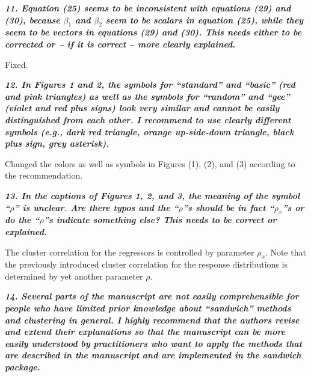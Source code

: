 \documentclass[10pt,a4paper]{article}
\begin{document}
\medskip

\textbf{\textit{11. Equation (25) seems to be inconsistent with equations (29) and (30), because $\beta_1$ and
$\beta_2$ seem to be scalars in equation (25), while they seem to be vectors in equations (29)
and (30). This needs either to be corrected or -- if it is correct -- more clearly explained.}}

\medskip

Fixed.

\medskip

\textbf{\textit{12. In Figures 1 and 2, the symbols for ``standard'' and ``basic'' (red and pink triangles)
as well as the symbols for ``random'' and ``gee'' (violet and red plus signs) look very
similar and cannot be easily distinguished from each other. I recommend to use clearly
different symbols (e.g., dark red triangle, orange up-side-down triangle, black plus sign,
grey asterisk).}}

\medskip

Changed the colors as well as symbols in Figures (1), (2), and (3) according to the recommendation.

\medskip

\textbf{\textit{13. In the captions of Figures 1, 2, and 3, the meaning of the symbol ``$\rho$'' is unclear. Are
there typos and the ``$\rho$''s should be in fact ``$\rho_x$''s or do the ``$\rho$''s indicate something else?
This needs to be correct or explained.}}

\medskip

The cluster correlation for the regressors is controlled by parameter $\rho_x$. Note that the previously introduced cluster correlation for the response distributions is determined by yet another parameter $\rho$.

\medskip

\textbf{\textit{14. Several parts of the manuscript are not easily comprehensible for people who have limited
prior knowledge about ``sandwich'' methods and clustering in general. I highly recommend
that the authors revise and extend their explanations so that the manuscript can be more
easily understood by practitioners who want to apply the methods that are described in
the manuscript and are implemented in the sandwich package.}}
\end{document}
